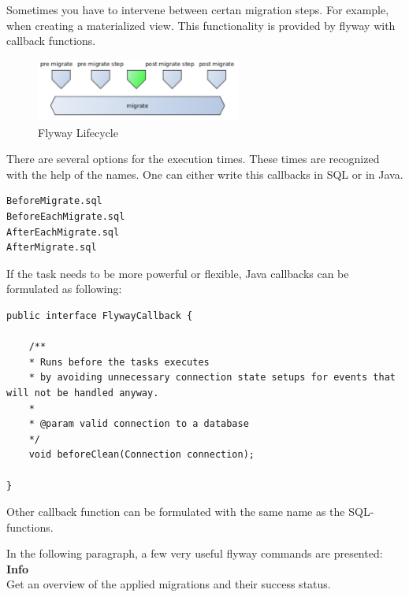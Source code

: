 %
Sometimes you have to intervene between certan migration steps. For example, when creating a materialized view. This functionality is provided by flyway with callback functions. 


\begin{figure}[H]
	\centering
	\includegraphics[width=0.6\textwidth]{./chapters/intro_flyway/images/advanced_migrations}
	\caption[Flyway Lifecycle - Source: \cite{Parsick2018}]{Flyway Lifecycle}
	\label{fig:advanced_migrations}
\end{figure}

There are several options for the execution times. These times are recognized with the help of the names. One can either write this callbacks in SQL or in Java. 

\begin{lstlisting}[caption=SQL Callback Functions for Flyway - Source: \cite{FlywayCallbacks}]
BeforeMigrate.sql
BeforeEachMigrate.sql
AfterEachMigrate.sql
AfterMigrate.sql
\end{lstlisting}

If the task needs to be more powerful or flexible, Java callbacks can be formulated as following:
\begin{lstlisting}[caption=Java Callback Functions before clean - Source: \cite{FlywayCallbacks}]
public interface FlywayCallback {

	/**
	* Runs before the tasks executes
	* by avoiding unnecessary connection state setups for events that will not be handled anyway.
	*
	* @param valid connection to a database
	*/
	void beforeClean(Connection connection);
	
}
\end{lstlisting}
Other callback function can be formulated with the same name as the SQL-functions.

%

In the following paragraph, a few very useful flyway commands are presented:\\

\textbf{Info}\\
Get an overview of the applied migrations and their success status.\\

